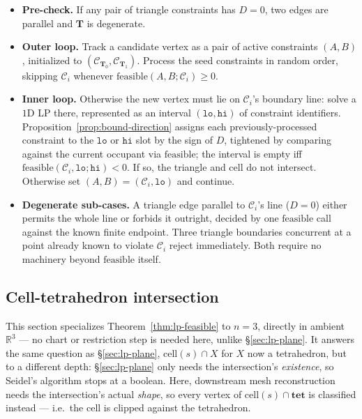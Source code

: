 \documentclass[12pt]{article}
\theoremstyle{definition}
\theoremstyle{remark}
\begin{document}
\begin{itemize}
    \item \textbf{Pre-check.} If any pair of triangle constraints has
    $D=0$, two edges are parallel and $\mathbf T$ is degenerate.
    \item \textbf{Outer loop.} Track a candidate vertex as a pair of active
    constraints $(A,B)$, initialized to $(\mathcal C_{\mathbf T_0},\mathcal
    C_{\mathbf T_1})$. Process the seed constraints in random order,
    skipping $\mathcal C_i$ whenever $\mathrm{feasible}(A,B;\mathcal
    C_i)\ge0$.
    \item \textbf{Inner loop.} Otherwise the new vertex must lie on
    $\mathcal C_i$'s boundary line: solve a $1$D LP there, represented as an
    interval $(\mathtt{lo},\mathtt{hi})$ of constraint identifiers.
    Proposition~\ref{prop:bound-direction} assigns each previously-processed
    constraint to the $\mathtt{lo}$ or $\mathtt{hi}$ slot by the sign of
    $D$, tightened by comparing against the current occupant via
    $\mathrm{feasible}$; the interval is empty iff
    $\mathrm{feasible}(\mathcal C_i,\mathtt{lo};\mathtt{hi})<0$. If so, the
    triangle and cell do not intersect. Otherwise set
    $(A,B)=(\mathcal C_i,\mathtt{lo})$ and continue.
    \item \textbf{Degenerate sub-cases.} A triangle edge parallel to
    $\mathcal C_i$'s line ($D=0$) either permits the whole line or forbids
    it outright, decided by one $\mathrm{feasible}$ call against the known
    finite endpoint. Three triangle boundaries concurrent at a point already
    known to violate $\mathcal C_i$ reject immediately. Both require no
    machinery beyond $\mathrm{feasible}$ itself.
\end{itemize}

\subsection{Cell-tetrahedron intersection}\label{sec:lp-tet}

This section specializes Theorem~\ref{thm:lp-feasible} to $n=3$, directly in
ambient $\mathbb{R}^3$ --- no chart or restriction step is needed here,
unlike \S\ref{sec:lp-plane}. It answers the same question as
\S\ref{sec:lp-plane}, $\mathrm{cell}(s)\cap X$ for $X$ now a tetrahedron, but
to a different depth: \S\ref{sec:lp-plane} only needs the intersection's
\emph{existence}, so Seidel's algorithm stops at a boolean. Here, downstream
mesh reconstruction needs the intersection's actual \emph{shape}, so every
vertex of $\mathrm{cell}(s)\cap\mathbf{tet}$ is classified instead --- i.e.\
the cell is clipped against the tetrahedron.
\end{document}

